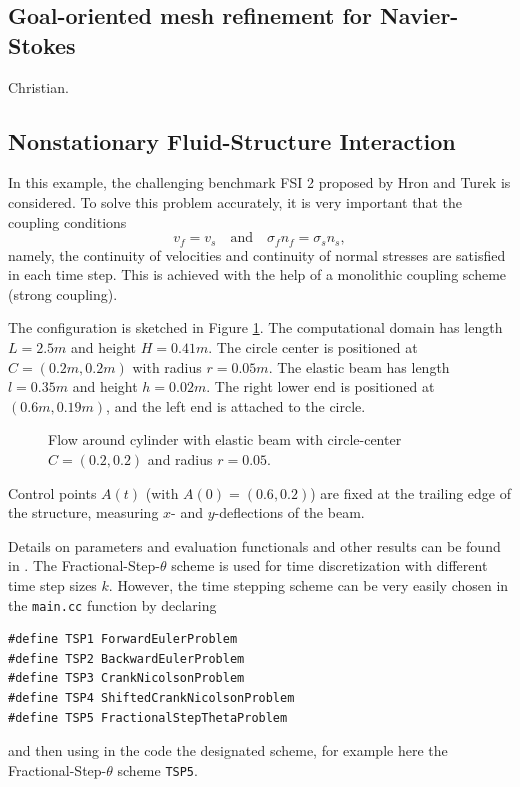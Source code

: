\documentclass[prodmode,acmtoms]{acmsmall}
\numberwithin{equation}{section}
\begin{document}
\subsection{Goal-oriented mesh refinement for Navier-Stokes}
Christian.


\subsection{Nonstationary Fluid-Structure Interaction}
In this example, the challenging benchmark FSI 2
proposed by Hron and Turek \cite{HrTu06b} is considered.
To solve this problem accurately, it is very important that 
the coupling conditions
\[
v_f = v_s \quad \text{and} \quad \sigma_f n_f = \sigma_s n_s, 
\]
namely, the continuity of velocities and continuity of normal stresses
are satisfied in each time step. This is achieved with the help of 
a monolithic coupling scheme (strong coupling).

The configuration is 
sketched in Figure \ref{configuration_csm_and_fsi_2D}. 
The computational domain has length $L=2.5m$ and height $H=0.41m$. The circle center
is positioned at $C=(0.2m,0.2m)$ with radius $r=0.05m$. The elastic beam has length
$l=0.35m$ and height $h=0.02m$. The right lower end is positioned at 
$(0.6m,0.19m)$, and
the left end is attached to the circle. 

\begin{figure}[h]
\centering

\caption{Flow around cylinder with elastic beam with 
circle-center $C=(0.2,0.2)$ and radius $r=0.05$.}
\label{configuration_csm_and_fsi_2D}
\end{figure}

Control points $A(t)$ (with $A(0) = (0.6,0.2)$) are fixed at the 
trailing edge of the structure, measuring $x$- and $y$-deflections of the beam.

Details 
on parameters and evaluation functionals and other results 
can be found in \cite{HrTu06b,BuSc06,DeHaeAnnBrVie10,Wi11}. 
The Fractional-Step-$\theta$ scheme is used for time discretization with
different time step sizes $k$. However, the time stepping scheme can be 
very easily chosen in the \texttt{main.cc} function by declaring
\begin{lstlisting}
#define TSP1 ForwardEulerProblem
#define TSP2 BackwardEulerProblem
#define TSP3 CrankNicolsonProblem
#define TSP4 ShiftedCrankNicolsonProblem
#define TSP5 FractionalStepThetaProblem
\end{lstlisting}
and then using in the code the designated scheme, 
for example here the Fractional-Step-$\theta$ scheme
\texttt{TSP5}.
\end{document}
